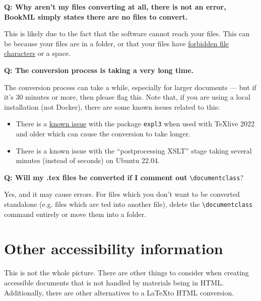 \noindent\textbf{Q: Why aren't my files converting at all, there is not an error, BookML simply states there are no files to convert.} 
\begin{ans}
    This is likely due to the fact that the software cannot reach your files. This can be because your files are in a folder, or that your files have \href{https://stackoverflow.com/questions/1976007/what-characters-are-forbidden-in-windows-and-linux-directory-names}{forbidden file characters} or a space.
\end{ans}

\noindent\textbf{Q: The conversion process is taking a very long time.}
\begin{ans}
    The conversion process can take a while, especially for larger documents --- but if it's 30 minutes or more, then please flag this. Note that, if you are using a local installation (not Docker), there are some known issues related to this:
    \begin{itemize}
        \item There is a \href{https://github.com/brucemiller/LaTeXML/issues/2268}{known issue} with the package \verb|expl3| when used with TeXlive 2022 and older which can cause the conversion to take longer.
        \item There is a known issue with the ``postprocessing XSLT'' stage taking several minutes (instead of seconds) on Ubuntu 22.04.
    \end{itemize}
\end{ans}
 
\noindent\textbf{Q: Will my .tex files be converted if I comment out} \verb|\|\verb|documentclass|? 
\begin{ans}
    Yes, and it may cause errors. For files which you don't want to be converted standalone (e.g. files which are \verb||ted into another file), delete the \verb|\|\verb|documentclass| command entirely or move them into a folder.
\end{ans}


\section{Other accessibility information}
\label{sec:otheraccessibility}

This is not the whole picture. There are other things to consider when creating accessible documents that is not handled by materials being in HTML. Additionally, there are other alternatives to a \LaTeX to HTML conversion.

